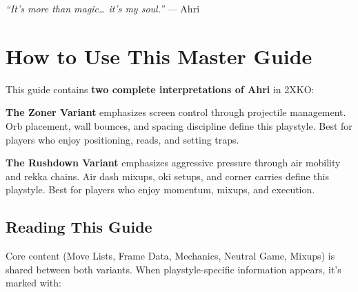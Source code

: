 \documentclass[12pt, a4paper]{report}
\newcommand{\faQuoteLeft}{\ding{125}}
\newcommand{\faQuoteRight}{\ding{126}}
\begin{document}
\begin{titlepage}
  \vfill

  {\small%
   \textcolor{ahriBlue!60}{\faQuoteLeft}\;%
   \textcolor{ahriAccent}{\textit{``It's more than magic{\ldots} it's my soul.''}}%
   \;\textcolor{ahriGray}{\small --- Ahri}%
   \;\textcolor{ahriBlue!60}{\faQuoteRight}%
  }

  \vspace{1.5cm}

\end{titlepage}

{
  \hypersetup{linkcolor=ahriAccent}
  \setlength{\parskip}{0pt}
  \tableofcontents
}
\clearpage

\chapter{How to Use This Master Guide}

This guide contains \textbf{two complete interpretations of Ahri} in 2XKO:

\vspace{4pt}

\begin{zonerinfobox}
\textbf{The Zoner Variant} emphasizes screen control through projectile management. Orb placement, wall bounces, and spacing discipline define this playstyle. Best for players who enjoy positioning, reads, and setting traps.
\end{zonerinfobox}

\vspace{6pt}

\begin{rushdowninfobox}
\textbf{The Rushdown Variant} emphasizes aggressive pressure through air mobility and rekka chains. Air dash mixups, oki setups, and corner carries define this playstyle. Best for players who enjoy momentum, mixups, and execution.
\end{rushdowninfobox}

\section{Reading This Guide}

Core content (Move Lists, Frame Data, Mechanics, Neutral Game, Mixups) is shared between both variants. When playstyle-specific information appears, it's marked with:
\end{document}
